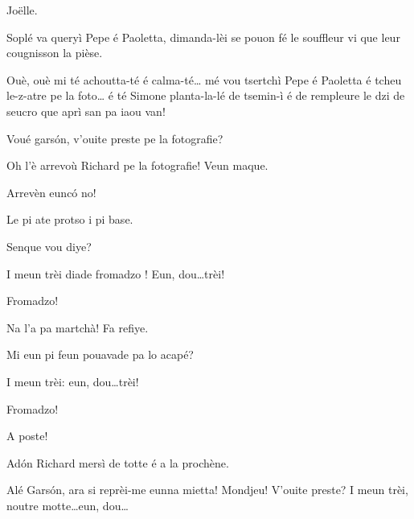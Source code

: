 \begin{drama}
\Joellespeaks Jo\"{e}lle.

\Cimaspeaks Soplé va queryì Pepe é Paoletta, dimanda-lèi se pouon fé le souffleur vi que leur cougnisson la pièse.

\Joellespeaks Ouè, ouè mi té achoutta-té é calma-té\ldots {} mé vou tsertchì Pepe é Paoletta é tcheu le-z-atre pe la foto\ldots {} é té Simone planta-la-lé de tsemin-ì é de rempleure le dzi de seucro que aprì san pa iaou van!


\Fotografespeaks Voué gars\'on, v'ouite preste pe la fotografie?

\Joelspeaks Oh l'è arrevoù Richard pe la fotografie! Veun maque.

\Joellespeaks {} Arrevèn euncó no!


\Fotografespeaks Le pi ate protso i pi base.

\Joelspeaks Senque vou diye?

\Fotografespeaks I meun trèi diade fromadzo \formaggio ! Eun, dou\ldots trèi!

\Tcheuttespeaks {} Fromadzo!

\Fotografespeaks Na l'a pa martchà! Fa refiye.

\Cimaspeaks Mi eun pi feun pouavade pa lo acapé?

\Fotografespeaks I meun trèi: eun, dou\ldots trèi!

\Tcheuttespeaks {} Fromadzo!

\Fotografespeaks A poste!


\Joelspeaks Ad\'on Richard mersì de totte é a la prochène.


\Joelspeaks Alé Gars\'on, ara si reprèi-me eunna mietta! Mondjeu! V'ouite pre\-ste? I meun trèi, noutre motte\ldots eun, dou\ldots


\end{drama}
